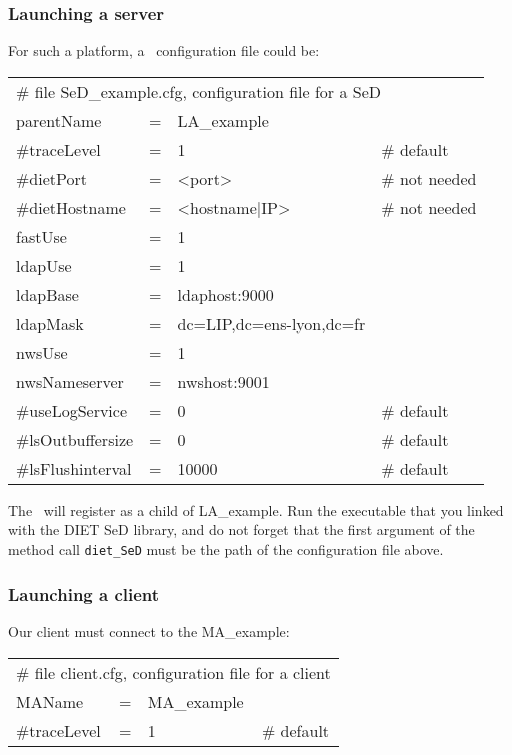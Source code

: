\subsubsection{Launching a server}

For such a platform, a \sed\ configuration file could be:
\tt
\begin{center}
 \footnotesize
 \begin{tabular}{lcll}
  \multicolumn{4}{l}{\# file SeD\_example.cfg, configuration file for a SeD}\\
  parentName   &=&LA\_example        &\\
  \#traceLevel &=&1                 &\# default\\
  \#dietPort    &=&<port>             &\# not needed\\
  \#dietHostname&=&<hostname|IP>      &\# not needed\\
  fastUse    &=&1                 &\\
  ldapUse    &=&1                 &\\
  ldapBase     &=&ldaphost:9000     &\\
  ldapMask     &=&dc=LIP,dc=ens-lyon,dc=fr&\\
  nwsUse     &=&1                 &\\
  nwsNameserver&=&nwshost:9001      &\\
  \#useLogService &=& 0               &\# default\\
  \#lsOutbuffersize &=& 0             &\# default\\
  \#lsFlushinterval &=& 10000           &\# default\\
 \end{tabular}
\end{center}
\rm

The \sed\ will register as a child of LA\_example. Run the executable
that you linked with the DIET SeD library, and do not forget that the
first argument of the method call \texttt{diet\_SeD} must be the path of the
configuration file above.


\subsubsection{Launching a client}

Our client must connect to the MA\_example:
\tt
\begin{center}
 \footnotesize
 \begin{tabular}{lcll}
  \multicolumn{4}{l}{\# file client.cfg, configuration file for a client}\\
  MAName       &=&MA\_example        &\\
  \#traceLevel &=&1                 &\# default\\
 \end{tabular}
\end{center}
\rm

